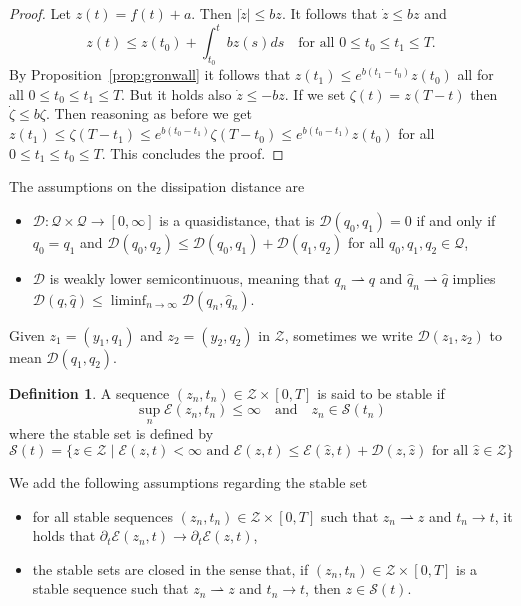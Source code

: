 \documentclass[a4paper,10pt,twoside]{amsbook}
\numberwithin{section}{chapter}
\numberwithin{equation}{chapter}
\theoremstyle{definition}
\newtheorem{defi}[prop]{Definition}
\begin{document}
\begin{proof}
Let $z(t)=f(t)+a$. Then $|\dot z|\le bz$. It follows that $\dot z\le bz$ and
\[
z(t)\le z(t_0)+\int_{t_0}^{t}b z(s)ds\quad\text{for all $0\le t_0\le t_1\le T$}.
\]
By Proposition~\ref{prop:gronwall} it follows that $z(t_1)\le e^{b(t_1-t_0)}z(t_0)$ all for all $0\le t_0\le t_1\le T$. But it holds also $\dot z\le -bz$. If we set $\zeta(t)=z(T-t)$ then $\dot\zeta\le b\zeta$. Then reasoning as before we get $z(t_1)\le\zeta(T-t_1)\le e^{b(t_0-t_1)}\zeta(T-t_0)\le e^{b(t_0-t_1)}z(t_0)$ for all $0\le t_1\le t_0\le T$. This concludes the proof.
\end{proof}
The assumptions on the dissipation distance are
\begin{itemize}[itemsep=0.5em]
\item[($\mathcal{D}$1)] $\mathcal{D}\colon\mathscr{Q}\times\mathscr{Q}\to[0,\infty]$ is a quasidistance, that is $\mathcal{D}(q_0,q_1)=0$ if and only if $q_0=q_1$ and $\mathcal{D}(q_0,q_2)\le\mathcal{D}(q_0,q_1)+\mathcal{D}(q_1,q_2)$ for all $q_0,q_1,q_2\in\mathscr{Q}$,
\item[($\mathcal{D}$2)] $\mathcal{D}$ is weakly lower semicontinuous, meaning that $q_n\rightharpoonup q$ and $\hat{q}_n\rightharpoonup\hat{q}$ implies $\mathcal{D}(q,\hat{q})\le\liminf_{n\to\infty}\mathcal{D}(q_n,\hat{q}_n)$.
\end{itemize}
Given $z_1=(y_1,q_1)$ and $z_2=(y_2,q_2)$ in $\mathscr{Z}$, sometimes we write $\mathcal{D}(z_1,z_2)$ to mean $\mathcal{D}(q_1,q_2)$.
\begin{defi}
A sequence $(z_n,t_n)\in\mathscr{Z}\times[0,T]$ is said to be stable if
\[
\sup_n\mathcal{E}(z_n,t_n)\le\infty\quad\text{and}\quad z_n\in\mathscr{S}(t_n)
\]
where the stable set is defined by
\[
\mathscr{S}(t)=\{z\in\mathscr{Z}\;|\;\text{$\mathcal{E}(z,t)<\infty$ and $\mathcal{E}(z,t)\le\mathcal{E}(\hat{z},t)+\mathcal{D}(z,\hat{z})$ for all $\hat{z}\in\mathscr{Z}$}\}
\]
\end{defi}
We add the following assumptions regarding the stable set
\begin{itemize}[itemsep=0.5em]
\item[(C1)] for all stable sequences $(z_n,t_n)\in\mathscr{Z}\times[0,T]$ such that $z_n\rightharpoonup z$ and $t_n\to t$, it holds that $\partial_t\mathcal{E}(z_n,t)\to\partial_t\mathcal{E}(z,t)$,
\item[(C2)] the stable sets are closed in the sense that, if $(z_n,t_n)\in\mathscr{Z}\times[0,T]$ is a stable sequence such that $z_n\rightharpoonup z$ and $t_n\to t$, then $z\in\mathscr{S}(t)$.
\end{itemize}
\end{document}
